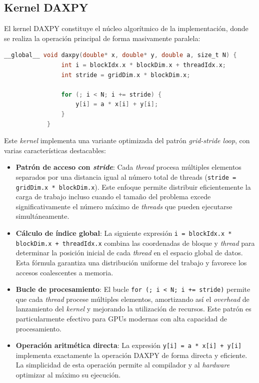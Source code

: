     \subsection{Kernel DAXPY}
    
        El kernel DAXPY constituye el núcleo algorítmico de la implementación, donde se realiza la operación principal de forma masivamente paralela:
        
        \begin{lstlisting}[language=C, caption={Código \textit{kernel} daxpy.}, gobble=12]
            __global__ void daxpy(double* x, double* y, double a, size_t N) {
                int i = blockIdx.x * blockDim.x + threadIdx.x;
                int stride = gridDim.x * blockDim.x;
                
                for (; i < N; i += stride) {
                    y[i] = a * x[i] + y[i];
                }
            }
        \end{lstlisting}
    
        Este \textit{kernel} implementa una variante optimizada del patrón\textit{ grid-stride loop}, con varias características destacables:
        
        \begin{itemize}
        
            \item \textbf{Patrón de acceso con \textit{stride}}: Cada \textit{thread} procesa múltiples elementos separados por una distancia igual al número total de threads (\texttt{stride = gridDim.x * blockDim.x}). Este enfoque permite distribuir eficientemente la carga de trabajo incluso cuando el tamaño del problema excede significativamente el número máximo de \textit{threads} que pueden ejecutarse simultáneamente.
            
            \item \textbf{Cálculo de índice global}: La siguiente expresión \texttt{i = blockIdx.x * blockDim.x + threadIdx.x} combina las coordenadas de bloque y \textit{thread} para determinar la posición inicial de cada \textit{thread} en el espacio global de datos. Esta fórmula garantiza una distribución uniforme del trabajo y favorece los accesos coalescentes a memoria.
            
            \item \textbf{Bucle de procesamiento}: El bucle \texttt{for (; i < N; i += stride)} permite que cada \textit{thread} procese múltiples elementos, amortizando así el \textit{overhead} de lanzamiento del \textit{kernel} y mejorando la utilización de recursos. Este patrón es particularmente efectivo para GPUs modernas con alta capacidad de procesamiento.
            
            \item \textbf{Operación aritmética directa}: La expresión \texttt{y[i] = a * x[i] + y[i]} implementa exactamente la operación DAXPY de forma directa y eficiente. La simplicidad de esta operación permite al compilador y al \textit{hardware} optimizar al máximo su ejecución.
            
        \end{itemize}
        
